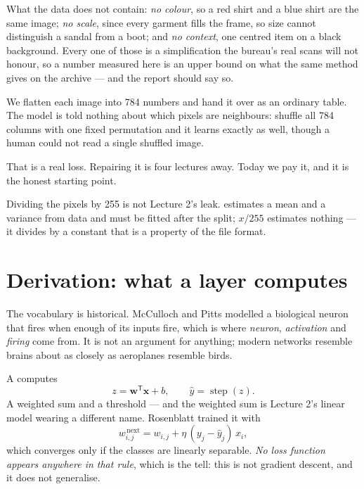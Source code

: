 \documentclass[11pt,a4paper]{article}
\begin{document}
What the data does not contain: \emph{no colour}, so a red shirt and a blue
shirt are the same image; \emph{no scale}, since every garment fills the frame,
so size cannot distinguish a sandal from a boot; and \emph{no context}, one
centred item on a black background. Every one of those is a simplification the
bureau's real scans will not honour, so a number measured here is an upper
bound on what the same method gives on the archive --- and the report should
say so.

\begin{failbox}[title={Failure condition --- a pixel is a feature, and that costs something}]
We flatten each image into 784 numbers and hand it over as an ordinary table.
The model is told nothing about which pixels are neighbours: shuffle all 784
columns with one fixed permutation and it learns exactly as well, though a
human could not read a single shuffled image.

That is a real loss. Repairing it is four lectures away. Today we pay it, and
it is the honest starting point.
\end{failbox}

Dividing the pixels by 255 is not Lecture 2's leak. 
estimates a mean and a variance from data and must be fitted after the split;
$x/255$ estimates nothing --- it divides by a constant that is a property of
the file format.

\section{Derivation: what a layer computes}

The vocabulary is historical. McCulloch and Pitts modelled a biological neuron
that fires when enough of its inputs fire, which is where \emph{neuron},
\emph{activation} and \emph{firing} come from. It is not an argument for
anything; modern networks resemble brains about as closely as aeroplanes
resemble birds.

A  computes
\[ z = \mathbf{w}^{\mathsf T}\mathbf{x} + b,
   \qquad \hat y = \operatorname{step}(z). \]
A weighted sum and a threshold --- and the weighted sum is Lecture 2's linear
model wearing a different name. Rosenblatt trained it with
\[ w_{i,j}^{\,\text{next}} = w_{i,j} + \eta\,(y_j - \hat y_j)\,x_i, \]
which converges only if the classes are linearly separable. \emph{No loss
function appears anywhere in that rule}, which is the tell: this is not
gradient descent, and it does not generalise.
\end{document}

